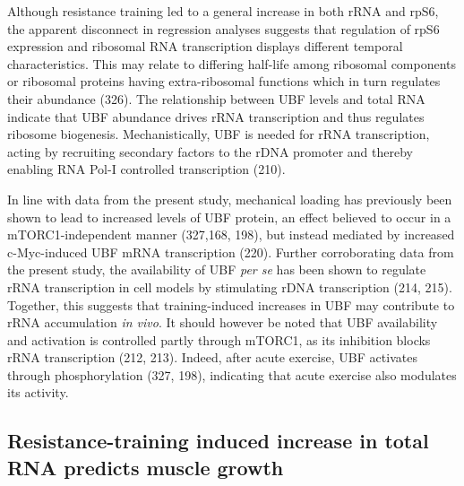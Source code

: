 \documentclass[twoside,10pt]{gihclass} %
\begin{document}
Although resistance training led to a general increase in both rRNA and rpS6, the apparent disconnect in regression analyses suggests that regulation of rpS6 expression and ribosomal RNA transcription displays different temporal characteristics. This may relate to differing half-life among ribosomal components or ribosomal proteins having extra-ribosomal functions which in turn regulates their abundance
(326).
The relationship between UBF levels and total RNA indicate that UBF abundance drives rRNA transcription and thus regulates ribosome biogenesis.
Mechanistically, UBF is needed for rRNA transcription, acting by recruiting secondary factors to the rDNA promoter and thereby enabling RNA Pol-I controlled transcription
(210).

In line with data from the present study, mechanical loading has previously been shown to lead to increased levels of UBF protein, an effect believed to occur in a mTORC1-independent manner
(327,168, 198),
but instead mediated by increased c-Myc-induced UBF mRNA transcription (220).
Further corroborating data from the present study, the availability of UBF \emph{per se} has been shown to regulate rRNA transcription in cell models by stimulating rDNA transcription
(214, 215).
Together, this suggests that training-induced increases in UBF may contribute to rRNA accumulation \emph{in vivo}.
It should however be noted that UBF availability and activation is controlled partly through mTORC1, as its inhibition blocks rRNA transcription
(212, 213).
Indeed, after acute exercise, UBF activates through phosphorylation
(327, 198),
indicating that acute exercise also modulates its activity.

\hypertarget{resistance-training-induced-increase-in-total-rna-predicts-muscle-growth}{%
\subsection{Resistance-training induced increase in total RNA predicts muscle growth}\label{resistance-training-induced-increase-in-total-rna-predicts-muscle-growth}}
\end{document}
